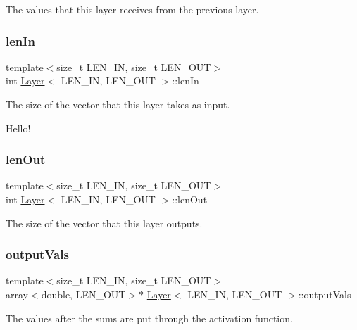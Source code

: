 The values that this layer receives from the previous layer. 

\mbox{\label{class_layer_a844e22c542ae02cb475cabb8353300a8}} 
\subsubsection{\texorpdfstring{len\+In}{lenIn}}
{\footnotesize\ttfamily template$<$size\+\_\+t L\+E\+N\+\_\+\+IN, size\+\_\+t L\+E\+N\+\_\+\+O\+UT$>$ \\
int \hyperlink{class_layer}{Layer}$<$ L\+E\+N\+\_\+\+IN, L\+E\+N\+\_\+\+O\+UT $>$\+::len\+In}



The size of the vector that this layer takes as input. 

Hello! \mbox{\label{class_layer_ae10a61035ba7a18f9f2a6d1d3ebf9811}} 
\subsubsection{\texorpdfstring{len\+Out}{lenOut}}
{\footnotesize\ttfamily template$<$size\+\_\+t L\+E\+N\+\_\+\+IN, size\+\_\+t L\+E\+N\+\_\+\+O\+UT$>$ \\
int \hyperlink{class_layer}{Layer}$<$ L\+E\+N\+\_\+\+IN, L\+E\+N\+\_\+\+O\+UT $>$\+::len\+Out}



The size of the vector that this layer outputs. 

\mbox{\label{class_layer_a5007d0043790b288b9473ec233108482}} 
\subsubsection{\texorpdfstring{output\+Vals}{outputVals}}
{\footnotesize\ttfamily template$<$size\+\_\+t L\+E\+N\+\_\+\+IN, size\+\_\+t L\+E\+N\+\_\+\+O\+UT$>$ \\
array$<$double, L\+E\+N\+\_\+\+O\+UT$>$$\ast$ \hyperlink{class_layer}{Layer}$<$ L\+E\+N\+\_\+\+IN, L\+E\+N\+\_\+\+O\+UT $>$\+::output\+Vals}



The values after the sums are put through the activation function. 


